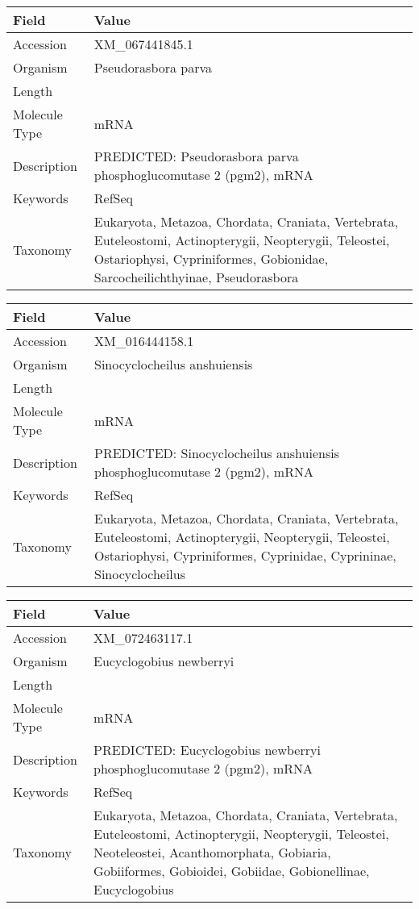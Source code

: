 \documentclass[10pt]{article}
\begin{document}
\vspace{1em}
{\footnotesize
\begin{longtable}{>{\raggedright\arraybackslash}p{4.5cm} >{\raggedright\arraybackslash}p{11.5cm}}
\textbf{Field} & \textbf{Value} \\
\hline
Accession & XM\_067441845.1 \\
Organism & Pseudorasbora parva \\
Length & 3125 \\
Molecule Type & mRNA \\
Description & PREDICTED: Pseudorasbora parva phosphoglucomutase 2 (pgm2), mRNA \\
Keywords & RefSeq \\
Taxonomy & Eukaryota, Metazoa, Chordata, Craniata, Vertebrata, Euteleostomi, Actinopterygii, Neopterygii, Teleostei, Ostariophysi, Cypriniformes, Gobionidae, Sarcocheilichthyinae, Pseudorasbora \\
\end{longtable}
}

\vspace{1em}
{\footnotesize
\begin{longtable}{>{\raggedright\arraybackslash}p{4.5cm} >{\raggedright\arraybackslash}p{11.5cm}}
\textbf{Field} & \textbf{Value} \\
\hline
Accession & XM\_016444158.1 \\
Organism & Sinocyclocheilus anshuiensis \\
Length & 3099 \\
Molecule Type & mRNA \\
Description & PREDICTED: Sinocyclocheilus anshuiensis phosphoglucomutase 2 (pgm2), mRNA \\
Keywords & RefSeq \\
Taxonomy & Eukaryota, Metazoa, Chordata, Craniata, Vertebrata, Euteleostomi, Actinopterygii, Neopterygii, Teleostei, Ostariophysi, Cypriniformes, Cyprinidae, Cyprininae, Sinocyclocheilus \\
\end{longtable}
}

\vspace{1em}
{\footnotesize
\begin{longtable}{>{\raggedright\arraybackslash}p{4.5cm} >{\raggedright\arraybackslash}p{11.5cm}}
\textbf{Field} & \textbf{Value} \\
\hline
Accession & XM\_072463117.1 \\
Organism & Eucyclogobius newberryi \\
Length & 1889 \\
Molecule Type & mRNA \\
Description & PREDICTED: Eucyclogobius newberryi phosphoglucomutase 2 (pgm2), mRNA \\
Keywords & RefSeq \\
Taxonomy & Eukaryota, Metazoa, Chordata, Craniata, Vertebrata, Euteleostomi, Actinopterygii, Neopterygii, Teleostei, Neoteleostei, Acanthomorphata, Gobiaria, Gobiiformes, Gobioidei, Gobiidae, Gobionellinae, Eucyclogobius \\
\end{longtable}
}
\end{document}
